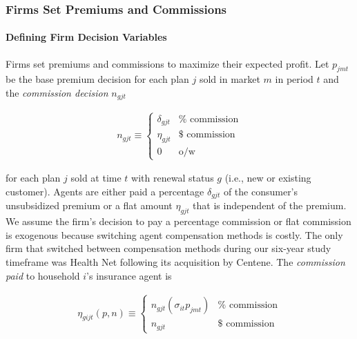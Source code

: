 \documentclass[12pt]{article}
\begin{document}
\subsubsection{Firms Set Premiums and Commissions}

\paragraph{Defining Firm Decision Variables}

Firms set premiums and commissions to maximize their expected profit.  Let $p_{jmt}$ be the base premium decision for each plan $j$ sold in market $m$ in period $t$ and the \textit{commission decision} $n_{gjt}$ 

   
	\vspace{-0.4in}		
		\singlespacing
		
				\begin{eqnarray*}
	n_{gjt}  \equiv \begin{cases} 
		\delta_{gjt} & \mathrm{\% \,\, commission} \\		
		\eta_{gjt} & \mathrm{\$ \,\, commission} \\
		0 & \mathrm{o/w}
   \end{cases}
	\end{eqnarray*}		   
   

\doublespacing
  

\noindent for each plan $j$ sold at time $t$ with renewal status $g$ (i.e., new or existing customer). Agents are either paid a percentage $\delta_{gjt}$  of the consumer's unsubsidized premium  or a flat amount $\eta_{gjt}$ that is independent of the premium.  We assume the firm's decision to pay a percentage commission or flat commission is exogenous because switching agent compensation methods is costly.  The only firm that switched between compensation methods during our six-year study timeframe was Health Net following its acquisition by Centene. The \textit{commission paid} to household $i$'s insurance agent is


		\vspace{-0.4in}		
		\singlespacing			
		
			\begin{eqnarray*}
	\eta_{gijt}(\textit{p},\textit{n})  \equiv \begin{cases} 
		n_{gjt} \left(\sigma_{it}p_{jmt}\right) & \mathrm{\% \,\, commission} \\		
		n_{gjt} & \mathrm{\$ \,\, commission}
   \end{cases}
	\end{eqnarray*}
\end{document}
